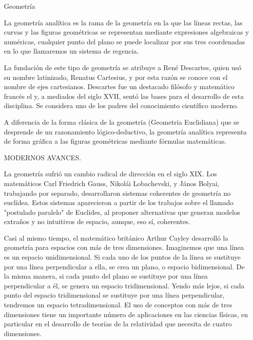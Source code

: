 \begin{myexampleblock}{Geometría}
\begin{footnotesize}
\vspace{2mm} La geometría analítica es la rama de la geometría en la que las líneas rectas, las curvas y las figuras geométricas se representan mediante expresiones algebraicas y numéricas, cualquier punto del plano se puede localizar por sus tres coordenadas en lo que llamaremos un sistema de regencia.

\vspace{2mm} La fundación de este tipo de geometría se atribuye a René Descartes, quien usó su nombre latinizado, Renatus Cartesius, y por esta razón se conoce con el nombre de ejes cartesianos. Descartes fue un destacado filósofo y matemático francés el y, a mediados del siglo XVII, sentó las bases para el desarrollo de esta disciplina. Se considera uno de los padres del conocimiento científico moderno.

\vspace{2mm} A diferencia de la forma clásica de la geometría (Geometría Euclidiana) que se desprende de un razonamiento lógico-deductivo, la geometría analítica representa de forma gráfica a las figuras geométricas mediante fórmulas matemáticas.



\vspace{2mm} MODERNOS AVANCES.

\vspace{2mm} La geometría sufrió un cambio radical de dirección en el siglo XIX. Los matemáticos Carl Friedrich Gauss, Nikolái Lobachevski, y János Bolyai, trabajando por separado, desarrollaron sistemas coherentes de geometría no euclídea. Estos sistemas aparecieron a partir de los trabajos sobre el llamado "postulado paralelo" de Euclides, al proponer alternativas que generan modelos extraños y no intuitivos de espacio, aunque, eso sí, coherentes.

\vspace{2mm} Casi al mismo tiempo, el matemático británico Arthur Cayley desarrolló la geometría para espacios con más de tres dimensiones. Imaginemos que una línea es un espacio unidimensional. Si cada uno de los puntos de la línea se sustituye por una línea perpendicular a ella, se crea un plano, o espacio bidimensional. De la misma manera, si cada punto del plano se sustituye por una línea perpendicular a él, se genera un espacio tridimensional. Yendo más lejos, si cada punto del espacio tridimensional se sustituye por una línea perpendicular, tendremos un espacio tetradimensional. El uso de conceptos con más de tres dimensiones tiene un importante número de aplicaciones en las ciencias físicas, en particular en el desarrollo de teorías de la relatividad que necesita de cuatro dimensiones.


\end{footnotesize}
\end{myexampleblock}
